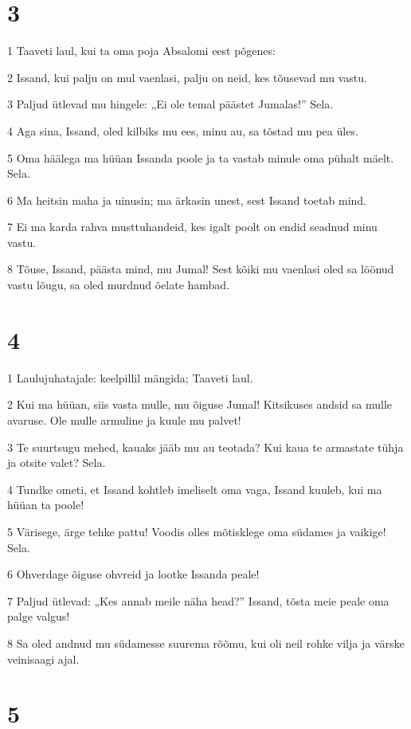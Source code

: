 \chapter{3}

\par 1 Taaveti laul, kui ta oma poja Absalomi eest põgenes:
\par 2 Issand, kui palju on mul vaenlasi, palju on neid, kes tõusevad mu vastu.
\par 3 Paljud ütlevad mu hingele: „Ei ole temal päästet Jumalas!” Sela.
\par 4 Aga sina, Issand, oled kilbiks mu ees, minu au, sa tõstad mu pea üles.
\par 5 Oma häälega ma hüüan Issanda poole ja ta vastab minule oma pühalt mäelt. Sela.
\par 6 Ma heitsin maha ja uinusin; ma ärkasin unest, sest Issand toetab mind.
\par 7 Ei ma karda rahva musttuhandeid, kes igalt poolt on endid seadnud minu vastu.
\par 8 Tõuse, Issand, päästa mind, mu Jumal! Sest kõiki mu vaenlasi oled sa löönud vastu lõugu, sa oled murdnud õelate hambad.

\chapter{4}

\par 1 Laulujuhatajale: keelpillil mängida; Taaveti laul.
\par 2 Kui ma hüüan, siis vasta mulle, mu õiguse Jumal! Kitsikuses andsid sa mulle avaruse. Ole mulle armuline ja kuule mu palvet!
\par 3 Te suurtsugu mehed, kauaks jääb mu au teotada? Kui kaua te armastate tühja ja otsite valet? Sela.
\par 4 Tundke ometi, et Issand kohtleb imeliselt oma vaga, Issand kuuleb, kui ma hüüan ta poole!
\par 5 Värisege, ärge tehke pattu! Voodis olles mõtisklege oma südames ja vaikige! Sela.
\par 6 Ohverdage õiguse ohvreid ja lootke Issanda peale!
\par 7 Paljud ütlevad: „Kes annab meile näha head?” Issand, tõsta meie peale oma palge valgus!
\par 8 Sa oled andnud mu südamesse suurema rõõmu, kui oli neil rohke vilja ja värske veinisaagi ajal.

\chapter{5}

